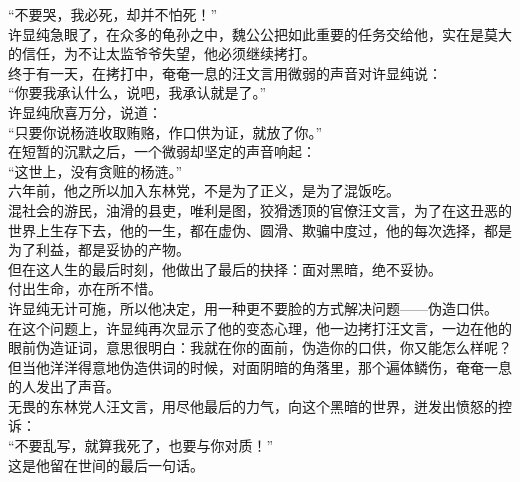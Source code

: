 \begin{multicols}{\theparacolNo}
“不要哭，我必死，却并不怕死！”\\

许显纯急眼了，在众多的龟孙之中，魏公公把如此重要的任务交给他，实在是莫大的信任，为不让太监爷爷失望，他必须继续拷打。\\

终于有一天，在拷打中，奄奄一息的汪文言用微弱的声音对许显纯说：\\

“你要我承认什么，说吧，我承认就是了。”\\

许显纯欣喜万分，说道：\\

“只要你说杨涟收取贿赂，作口供为证，就放了你。”\\

在短暂的沉默之后，一个微弱却坚定的声音响起：\\

“这世上，没有贪赃的杨涟。”\\

六年前，他之所以加入东林党，不是为了正义，是为了混饭吃。\\

混社会的游民，油滑的县吏，唯利是图，狡猾透顶的官僚汪文言，为了在这丑恶的世界上生存下去，他的一生，都在虚伪、圆滑、欺骗中度过，他的每次选择，都是为了利益，都是妥协的产物。\\

但在这人生的最后时刻，他做出了最后的抉择：面对黑暗，绝不妥协。\\

付出生命，亦在所不惜。\\

许显纯无计可施，所以他决定，用一种更不要脸的方式解决问题——伪造口供。\\

在这个问题上，许显纯再次显示了他的变态心理，他一边拷打汪文言，一边在他的眼前伪造证词，意思很明白：我就在你的面前，伪造你的口供，你又能怎么样呢？\\

但当他洋洋得意地伪造供词的时候，对面阴暗的角落里，那个遍体鳞伤，奄奄一息的人发出了声音。\\

无畏的东林党人汪文言，用尽他最后的力气，向这个黑暗的世界，迸发出愤怒的控诉：\\

“不要乱写，就算我死了，也要与你对质！”\\

这是他留在世间的最后一句话。\\


\end{multicols}
